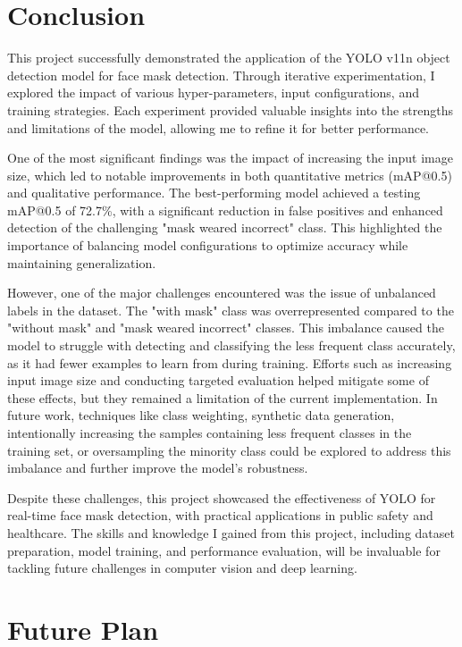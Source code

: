 \documentclass[11pt]{article}
\begin{document}
\section{Conclusion}

This project successfully demonstrated the application of the YOLO v11n object detection model for face mask detection. Through iterative experimentation, I explored the impact of various hyper-parameters, input configurations, and training strategies. Each experiment provided valuable insights into the strengths and limitations of the model, allowing me to refine it for better performance.

One of the most significant findings was the impact of increasing the input image size, which led to notable improvements in both quantitative metrics (mAP@0.5) and qualitative performance. The best-performing model achieved a testing mAP@0.5 of 72.7\%, with a significant reduction in false positives and enhanced detection of the challenging "mask weared incorrect" class. This highlighted the importance of balancing model configurations to optimize accuracy while maintaining generalization.

However, one of the major challenges encountered was the issue of unbalanced labels in the dataset. The "with mask" class was overrepresented compared to the "without mask" and "mask weared incorrect" classes. This imbalance caused the model to struggle with detecting and classifying the less frequent class accurately, as it had fewer examples to learn from during training. Efforts such as increasing input image size and conducting targeted evaluation helped mitigate some of these effects, but they remained a limitation of the current implementation. In future work, techniques like class weighting, synthetic data generation, intentionally increasing the samples containing less frequent classes in the training set, or oversampling the minority class could be explored to address this imbalance and further improve the model's robustness.

Despite these challenges, this project showcased the effectiveness of YOLO for real-time face mask detection, with practical applications in public safety and healthcare. The skills and knowledge I gained from this project, including dataset preparation, model training, and performance evaluation, will be invaluable for tackling future challenges in computer vision and deep learning.

\section{Future Plan}
\end{document}
